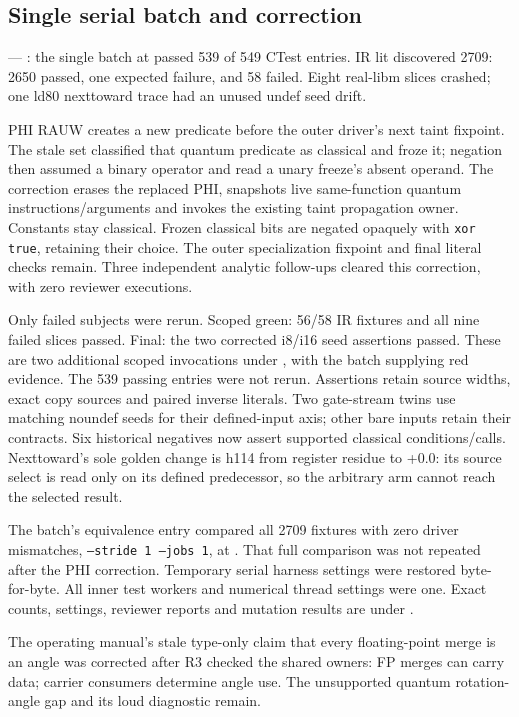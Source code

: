 \subsection*{Single serial batch and correction}
 --- : the single batch at
 passed 539 of 549 CTest entries. IR lit discovered 2709:
2650 passed, one expected failure, and 58 failed. Eight real-libm slices
crashed; one ld80 nexttoward trace had an unused undef seed drift.

PHI RAUW creates a new predicate before the outer driver's next taint fixpoint.
The stale set classified that quantum predicate as classical and froze it;
negation then assumed a binary operator and read a unary freeze's absent
operand. The correction erases the replaced PHI, snapshots live same-function
quantum instructions/arguments and invokes the existing taint propagation owner.
Constants stay classical. Frozen classical bits are negated opaquely with
\texttt{xor true}, retaining their choice. The outer specialization fixpoint
and final literal checks remain. Three independent analytic follow-ups cleared
this correction, with zero reviewer executions.

Only failed subjects were rerun. Scoped green: 56/58 IR fixtures and all nine
failed slices passed. Final: the two corrected i8/i16 seed assertions passed.
These are two additional scoped invocations under , with the
batch supplying red evidence. The 539 passing entries were not rerun.
Assertions retain source widths, exact copy sources and paired inverse literals.
Two gate-stream twins use matching noundef seeds for their defined-input axis;
other bare inputs retain their contracts. Six historical negatives now assert
supported classical conditions/calls. Nexttoward's sole golden change is h114
from register residue to +0.0: its source select is read only on its defined
predecessor, so the arbitrary arm cannot reach the selected result.

The batch's equivalence entry compared all 2709 fixtures with zero driver
mismatches, \texttt{--stride 1 --jobs 1}, at . That full
comparison was not repeated after the PHI correction. Temporary serial harness
settings were restored byte-for-byte. All inner test workers and numerical
thread settings were one. Exact counts, settings, reviewer reports and mutation
results are under .

The operating manual's stale type-only claim that every floating-point merge
is an angle was corrected after R3 checked the shared owners: FP merges can
carry data; carrier consumers determine angle use. The unsupported quantum
rotation-angle gap and its loud diagnostic remain.


